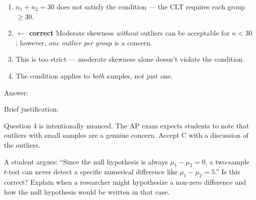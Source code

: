 \documentclass[10pt]{article}
\begin{document}
\begin{enumerate}
\begin{enumerate}[label=(\Alph*)]
  \item $n_1 + n_2 = 30$ does not satisfy the condition --- the CLT requires each group $\ge 30$.
  \item \textcolor{keyred}{\textbf{$\leftarrow$ correct}} Moderate skewness \emph{without} outliers can be acceptable for $n < 30$; however, \emph{one outlier per group} is a concern.
  \item This is too strict --- moderate skewness alone doesn't violate the condition.
  \item The condition applies to \emph{both} samples, not just one.
\end{enumerate}
\vspace{0.04in}
Answer: 

Brief justification: \gradedkeyline{\gradedblank[id=hw4b, type=rubric, points=1, display={\bfseries\boldmath both $n < 30$ with an outlier in each group}]{\linewidth+6pt}{0.19in}}

\begin{teachernote}
Question 4 is intentionally nuanced. The AP exam expects students to note that outliers
with small samples are a genuine concern. Accept C with a discussion of the outliers.
\end{teachernote}

\end{enumerate}

\begin{extensionbox}
A student argues: ``Since the null hypothesis is always $\mu_1 - \mu_2 = 0$, a two-sample
$t$-test can never detect a specific numerical difference like $\mu_1 - \mu_2 = 5$.''
Is this correct? Explain when a researcher might hypothesize a non-zero difference and
how the null hypothesis would be written in that case.
\ansline{}
\ansline{}
\end{extensionbox}
\end{document}
